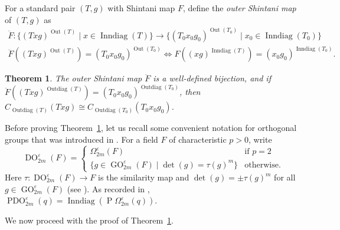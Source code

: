 \documentclass[11pt]{article}
\numberwithin{equation}{section}
\theoremstyle{shdefinition}
\theoremstyle{shplain}
\newtheorem{theorem}[definition]{Theorem}
\newcommand{\e}{\varepsilon}
\renewcommand{\t}{\tau}
\newcommand{\<}{\langle}
\renewcommand{\>}{\rangle}
\newcommand{\Out}{\operatorname{Out}}
\newcommand{\Inndiag}{\operatorname{Inndiag}}
\newcommand{\Outdiag}{\operatorname{Outdiag}}
\renewcommand{\:}{\colon}
\newcommand{\Om}{\Omega}
\newcommand{\DO}{\operatorname{DO}}
\newcommand{\GO}{\operatorname{GO}}
\newcommand{\POm}{\operatorname{P}\!\Om}
\newcommand{\PDO}{\operatorname{PDO}}
\begin{document}
For a standard pair $(T,g)$ with Shintani map $F$, define the \emph{outer Shintani map} of $(T,g)$ as
\begin{gather*}
\ddot{F}\:\{ (Txg)^{\Out(T)} \mid x \in \Inndiag(T) \} \to \{ (T_0x_0g_0)^{\Out(T_0)} \mid x_0 \in \Inndiag(T_0) \} \\
\ddot{F}((Txg)^{\Out(T)}) = (T_0x_0g_0)^{\Out(T_0)} \iff F((xg)^{\Inndiag(T)}) = (x_0g_0)^{\Inndiag(T_0)}.
\end{gather*}

\begin{theorem} \label{thm:shintani_outer}
The outer Shintani map $\ddot{F}$ is a well-defined bijection, and if $\ddot{F}((Txg)^{\Outdiag(T)}) = (T_0x_0g_0)^{\Outdiag(T_0)}$, then $C_{\Outdiag(T)}(Txg) \cong C_{\Outdiag(T_0)}(T_0x_0g_0)$.
\end{theorem}

Before proving Theorem~\ref{thm:shintani_outer}, let us recall some convenient notation for orthogonal groups that was introduced in \cite{ref:Harper}. For a field $F$ of characteristic $p > 0$, write
\[
\DO^\e_{2m}(F) = \left\{ 
\begin{array}{ll}
\Om^\e_{2m}(F)                                      & \text{if $p=2$} \\
\{ g \in \GO^\e_{2m}(F) \mid \det(g) = \tau(g)^m \} & \text{otherwise.}
\end{array}
\right.
\]
Here $\t\:\DO^\e_{2m}(F) \to F$ is the similarity map and $\det(g) = \pm\t(g)^m$ for all $g \in \GO^\e_{2m}(F)$ (see \cite[Lemmas~2.1.2 and~2.8.4]{ref:KleidmanLiebeck}). As recorded in \cite[(2.13)]{ref:Harper}, $\PDO^\e_{2m}(q) = \Inndiag(\POm^\e_{2m}(q))$.

We now proceed with the proof of Theorem~\ref{thm:shintani_outer}. 
\end{document}
